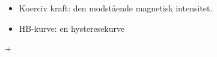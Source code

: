 
\begin{itemize}
\item Koerciv kraft: den modstående magnetisk intensitet.
\item HB-kurve: en hysteresekurve
\end{itemize}

+
